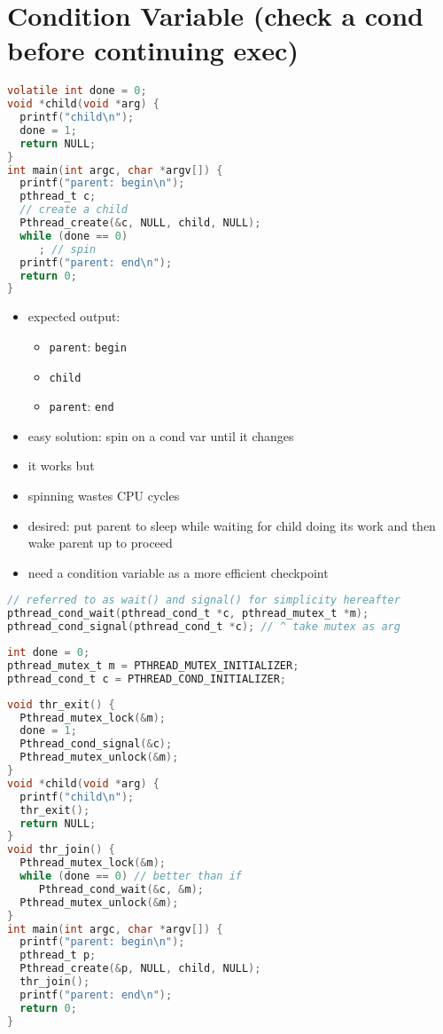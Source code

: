 \section*{Condition Variable (check a cond before continuing exec)}
\begin{minipage}{.58\linewidth}
\begin{lstlisting}[language=c]
volatile int done = 0;
void *child(void *arg) {
  printf("child\n");
  done = 1;
  return NULL;
}
int main(int argc, char *argv[]) {
  printf("parent: begin\n");
  pthread_t c;
  // create a child
  Pthread_create(&c, NULL, child, NULL);
  while (done == 0)
     ; // spin
  printf("parent: end\n");
  return 0;
}
\end{lstlisting}
\end{minipage}
\begin{minipage}{.42\linewidth}
  \flushleft
  \begin{itemize}
  \item expected output:
    \begin{itemize}
    \item[] \texttt{parent}: \texttt{begin}
    \item[] \texttt{child}
    \item[] \texttt{parent}: \texttt{end}
    \end{itemize}
  \item easy solution: spin on a cond var until it changes
  \item it works but  
  \item spinning wastes CPU cycles
  \item desired: put parent to sleep while waiting for child doing its work and then wake parent up to proceed
  \item need a condition variable as a more efficient checkpoint
  \end{itemize}
\end{minipage}
\begin{lstlisting}[language=c]
// referred to as wait() and signal() for simplicity hereafter
pthread_cond_wait(pthread_cond_t *c, pthread_mutex_t *m);
pthread_cond_signal(pthread_cond_t *c); // ^ take mutex as arg
\end{lstlisting}
\begin{lstlisting}[language=c]
int done = 0;
pthread_mutex_t m = PTHREAD_MUTEX_INITIALIZER;
pthread_cond_t c = PTHREAD_COND_INITIALIZER;
\end{lstlisting}
\begin{minipage}{.56\linewidth}
\begin{lstlisting}[language=c]
void thr_exit() {
  Pthread_mutex_lock(&m);
  done = 1;
  Pthread_cond_signal(&c);
  Pthread_mutex_unlock(&m);
}
void *child(void *arg) {
  printf("child\n");
  thr_exit();
  return NULL;
}
void thr_join() {
  Pthread_mutex_lock(&m);
  while (done == 0) // better than if
     Pthread_cond_wait(&c, &m);
  Pthread_mutex_unlock(&m);
}
int main(int argc, char *argv[]) {
  printf("parent: begin\n");
  pthread_t p;
  Pthread_create(&p, NULL, child, NULL);
  thr_join();
  printf("parent: end\n");
  return 0;
}
\end{lstlisting}
\end{minipage}
